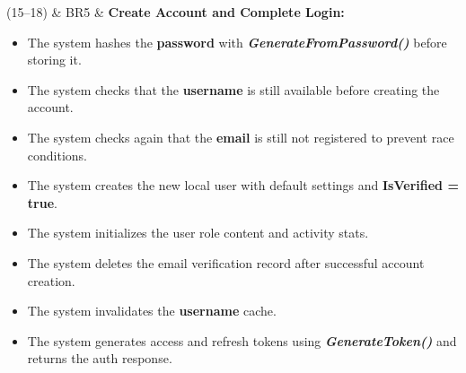 \documentclass{scrreprt}
\begin{document}
\begin{longtblr}[
    caption = {Business Rules for UC-01 - Sign Up},
    label = {tab:uc01_business_rules}
]
(15--18) & BR5 &
\textbf{Create Account and Complete Login:}
\begin{itemize}
    \item The system hashes the \textbf{password} with \textbf{\textit{GenerateFromPassword()}} before storing it.
    \item The system checks that the \textbf{username} is still available before creating the account.
    \item The system checks again that the \textbf{email} is still not registered to prevent race conditions.
    \item The system creates the new local user with default settings and \textbf{IsVerified = true}.
    \item The system initializes the user role content and activity stats.
    \item The system deletes the email verification record after successful account creation.
    \item The system invalidates the \textbf{username} cache.
    \item The system generates access and refresh tokens using \textbf{\textit{GenerateToken()}} and returns the auth response.
\end{itemize} \\
\end{longtblr}
\end{document}
